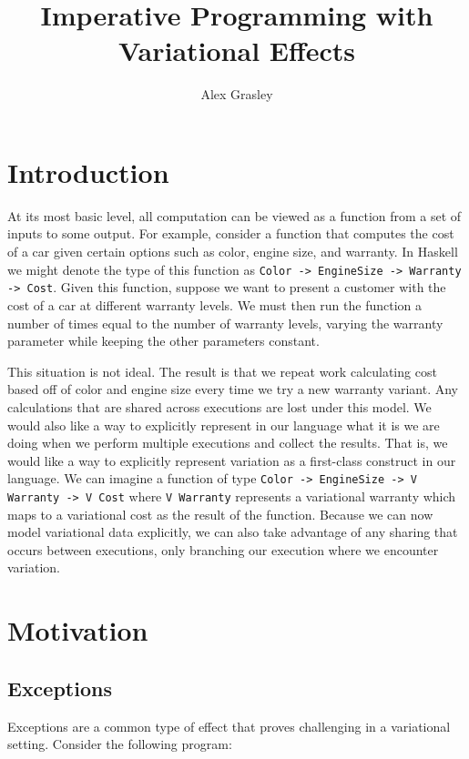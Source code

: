 \documentclass[letterpaper,10pt,onecolumn]{article}
\title{Imperative Programming with Variational Effects}
\author{Alex Grasley}
\begin{document}
\maketitle

\section{Introduction}

At its most basic level, all computation can be viewed as a function from a set of inputs to some
output. For example, consider a function that computes the cost of a car given certain options such
as color, engine size, and warranty. In Haskell we might denote the type of this function as
\texttt{Color -> EngineSize -> Warranty -> Cost}. Given this function, suppose we want to present
a customer with the cost of a car at different warranty levels. We must then run the function a number of
times equal to the number of warranty levels, varying the warranty parameter while keeping the other
parameters constant.

This situation is not ideal. The result is that we repeat work calculating cost based off of color and engine
size every time we try a new warranty variant. Any calculations that are shared across executions are
lost under this model. We would also like a way to explicitly represent in our language what it is 
we are doing when we perform multiple executions and collect the results. That is, we would like a way
to explicitly represent variation as a first-class construct in our language. We can imagine a function
of type \texttt{Color -> EngineSize -> V Warranty -> V Cost} where \texttt{V Warranty} represents a
variational warranty which maps to a variational cost as the result of the function. Because we can
now model variational data explicitly, we can also take advantage of any sharing that occurs between
executions, only branching our execution where we encounter variation.


\section{Motivation}

\subsection{Exceptions}

Exceptions are a common type of effect that proves challenging in a variational setting.
Consider the following program:
\end{document}
